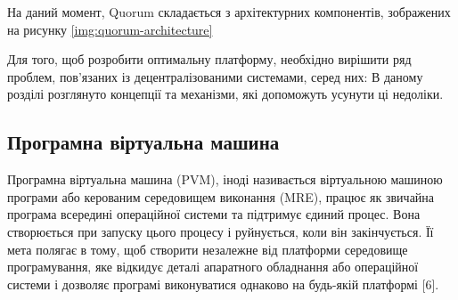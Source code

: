 \documentclass{lib/styles/default-style}
\begin{document}

    На даний момент, Quorum складається з архітектурних компонентів, зображених на рисунку \ref{img:quorum-architecture}



    Для того, щоб розробити оптимальну платформу, необхідно вирішити ряд проблем,
    пов'язаних із децентралізованими системами, серед них:
    В даному розділі розглянуто концепції та механізми, які допоможуть усунути ці недоліки.

\subsection{Програмна віртуальна машина}

    Програмна віртуальна машина (PVM), іноді називається віртуальною машиною програми
    або керованим середовищем виконання (MRE), 
    працює як звичайна програма всередині операційної системи та підтримує єдиний процес.
    Вона створюється при запуску цього процесу і руйнується, коли він закінчується.
    Її мета полягає в тому, щоб створити незалежне від платформи середовище програмування,
    яке відкидує деталі апаратного обладнання або операційної системи і
    дозволяє програмі виконуватися однаково на будь-якій платформі [6].
\end{document}
